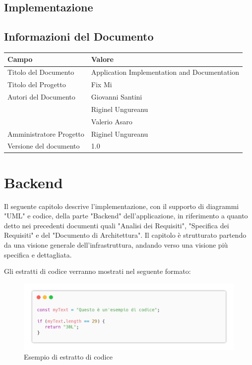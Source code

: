 \documentclass{report}
\begin{document}
	
	\section{Implementazione}
	
	\section{Informazioni del Documento}
	
	\begin{center} %
		\centering
		\begin{tabular}{ |p{4cm}|p{4cm}|  }
			\hline
			\centering Campo & \qquad\qquad Valore \\ %
			\hline
			Titolo del Documento & Application Implementation and Documentation \\
			\hline
			Titolo del Progetto & Fix Mi \\
			\hline
			Autori del Documento &
			Giovanni Santini \\ & Riginel Ungureanu \\ & Valerio Asaro \\
			\hline
			Amministratore Progetto & Riginel Ungureanu\\
			\hline
			Versione del documento & 1.0 \\
			\hline
		\end{tabular}
	\end{center}
	
	
	
\chapter{Backend}

Il seguente capitolo descrive l'implementazione, con il supporto di diagrammi "UML" e codice, della parte "Backend" dell'applicazione, in riferimento a quanto detto nei precedenti documenti quali "Analisi dei Requisiti", "Specifica dei Requisiti" e del "Documento di Architettura".  Il capitolo è strutturato partendo da una visione generale dell'infrastruttura, andando verso una visione più specifica e dettagliata.


Gli estratti di codice verranno mostrati nel seguente formato:
\begin{figure}[H]
	\centering\includegraphics[width=1\textwidth]{images/example_code_01.png}
	Esempio di estratto di codice
\end{figure}
\end{document}
